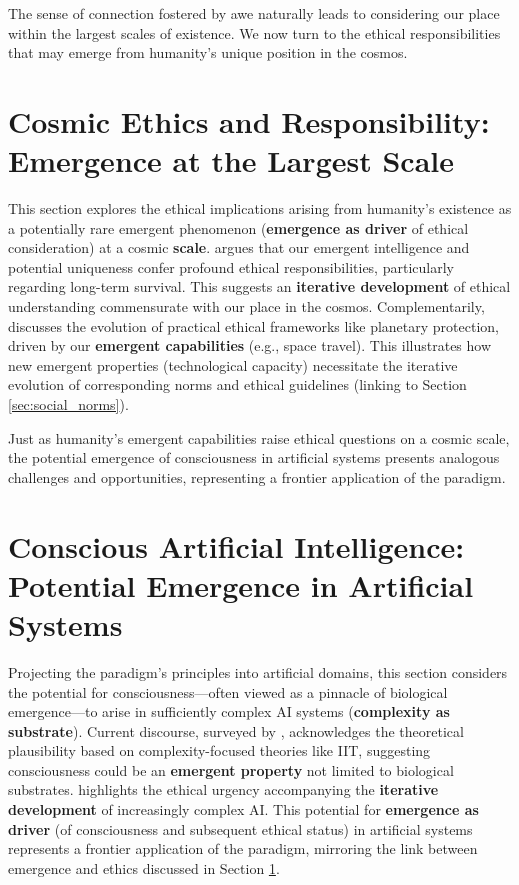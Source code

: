 \documentclass[12pt,openany]{book}
\begin{document}
The sense of connection fostered by awe naturally leads to considering our place within the largest scales of existence. We now turn to the ethical responsibilities that may emerge from humanity's unique position in the cosmos.

\section{Cosmic Ethics and Responsibility: Emergence at the Largest Scale} \label{sec:cosmic_ethics}
This section explores the ethical implications arising from humanity's existence as a potentially rare emergent phenomenon (\textbf{emergence as driver} of ethical consideration) at a cosmic \textbf{scale}. \citet{losapio2022cosmic} argues that our emergent intelligence and potential uniqueness confer profound ethical responsibilities, particularly regarding long-term survival. This suggests an \textbf{iterative development} of ethical understanding commensurate with our place in the cosmos. Complementarily, \citet{cockell2005planetary} discusses the evolution of practical ethical frameworks like planetary protection, driven by our \textbf{emergent capabilities} (e.g., space travel). This illustrates how new emergent properties (technological capacity) necessitate the iterative evolution of corresponding norms and ethical guidelines (linking to Section \ref{sec:social_norms}).

Just as humanity's emergent capabilities raise ethical questions on a cosmic scale, the potential emergence of consciousness in artificial systems presents analogous challenges and opportunities, representing a frontier application of the paradigm.

\section{Conscious Artificial Intelligence: Potential Emergence in Artificial Systems} \label{sec:ai}
Projecting the paradigm's principles into artificial domains, this section considers the potential for consciousness—often viewed as a pinnacle of biological emergence—to arise in sufficiently complex AI systems (\textbf{complexity as substrate}). Current discourse, surveyed by \citet{lenharo2023ai}, acknowledges the theoretical plausibility based on complexity-focused theories like IIT, suggesting consciousness could be an \textbf{emergent property} not limited to biological substrates. \citet{sutskever2023conscious} highlights the ethical urgency accompanying the \textbf{iterative development} of increasingly complex AI. This potential for \textbf{emergence as driver} (of consciousness and subsequent ethical status) in artificial systems represents a frontier application of the paradigm, mirroring the link between emergence and ethics discussed in Section \ref{sec:cosmic_ethics}.
\end{document}
